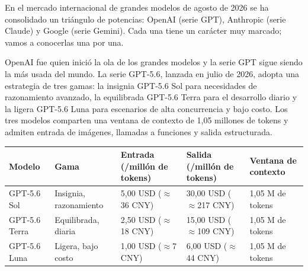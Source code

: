 


En el mercado internacional de grandes modelos de agosto de 2026 se ha consolidado un triángulo de potencias: OpenAI (serie GPT), Anthropic (serie Claude) y Google (serie Gemini). Cada una tiene un carácter muy marcado; vamos a conocerlas una por una.


OpenAI fue quien inició la ola de los grandes modelos y la serie GPT sigue siendo la más usada del mundo. La serie GPT-5.6, lanzada en julio de 2026, adopta una estrategia de tres gamas: la insignia GPT-5.6 Sol para necesidades de razonamiento avanzado, la equilibrada GPT-5.6 Terra para el desarrollo diario y la ligera GPT-5.6 Luna para escenarios de alta concurrencia y bajo costo. Los tres modelos comparten una ventana de contexto de 1,05 millones de tokens y admiten entrada de imágenes, llamadas a funciones y salida estructurada.

\begin{center}
\begin{tabularx}{\linewidth}{|X|X|X|X|X|}
\hline
\textbf{Modelo} & \textbf{Gama} & \textbf{Entrada (/millón de tokens)} & \textbf{Salida (/millón de tokens)} & \textbf{Ventana de contexto} \tabularnewline
\hline
GPT-5.6 Sol & Insignia, razonamiento & 5,00 USD ($\approx$36 CNY) & 30,00 USD ($\approx$217 CNY) & 1,05 M de tokens \tabularnewline
GPT-5.6 Terra & Equilibrada, diaria & 2,50 USD ($\approx$18 CNY) & 15,00 USD ($\approx$109 CNY) & 1,05 M de tokens \tabularnewline
GPT-5.6 Luna & Ligera, bajo costo & 1,00 USD ($\approx$7 CNY) & 6,00 USD ($\approx$44 CNY) & 1,05 M de tokens \tabularnewline
\hline
\end{tabularx}
\end{center}

